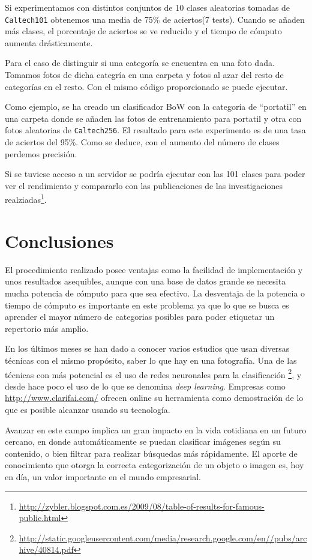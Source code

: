 \documentclass[a4paper,12pt]{article}
\begin{document}
Si experimentamos con distintos conjuntos de 10 clases aleatorias tomadas de 
\texttt{Caltech101} obtenemos una media de 75\% de aciertos(7 tests). Cuando
se añaden más clases, el porcentaje de aciertos se ve reducido y el tiempo de
cómputo aumenta drásticamente. 

Para el caso de distinguir si una categoría se encuentra en una foto dada. 
Tomamos fotos de dicha categría en una carpeta y fotos al azar del resto de 
categorías en el resto. Con el mismo código proporcionado se puede ejecutar.

Como ejemplo, se ha creado un clasificador BoW con la categoría de ``portatil''
en una carpeta donde se añaden las fotos de entrenamiento para portatil y otra
con fotos aleatorias de \texttt{Caltech256}. El resultado para este 
experimento es de una tasa de aciertos del 95\%. Como se deduce, con el aumento 
del número de clases perdemos precisión.

Si se tuviese acceso a un servidor se podría ejecutar con las 101 clases para 
poder ver el rendimiento y compararlo con las publicaciones de las investigaciones
realziadas\footnote{
\url{http://zybler.blogspot.com.es/2009/08/table-of-results-for-famous-public.html}}.

\newpage
\section{Conclusiones}

El procedimiento realizado posee ventajas como la facilidad de implementación
y unos resultados asequibles, aunque con una base de datos grande se necesita
mucha potencia de cómputo para que sea efectivo. La desventaja de la potencia o 
tiempo de cómputo es importante en este problema ya que lo que se busca es 
aprender el mayor número de categorias posibles para poder etiquetar un 
repertorio más amplio. 

En los últimos meses se han dado a conocer varios estudios que usan diversas 
técnicas con el mismo propósito, saber lo que hay en una fotografía. Una de las
técnicas con más potencial es el uso de redes neuronales para la clasificación
\footnote{\url{http://static.googleusercontent.com/media/research.google.com/en//pubs/archive/40814.pdf}},
y desde hace poco el uso de lo que se denomina \emph{deep learning}. Empresas como
\url{http://www.clarifai.com/} ofrecen online su herramienta como demostración
de lo que es posible alcanzar usando su tecnología.

Avanzar en este campo implica un gran impacto en la vida cotidiana en un futuro
cercano, en donde automáticamente se puedan clasificar imágenes según su 
contenido, o bien filtrar para realizar búsquedas más rápidamente. El aporte de 
conocimiento que otorga la correcta categorización de un objeto o imagen es, 
hoy en día, un valor importante en el mundo empresarial. 
\end{document}
